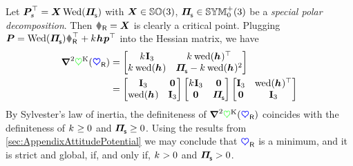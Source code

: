 Let $\mat{P}_{\!s}^\top = \mat{X} \wedMatOp(\bodyMOSs{}{})$ with $\boldsymbol{X}\in\mathbb{SO}(3)$, $\bodyMOSs{}{}\in\SymMatSP(3)$ be a \textit{special polar decomposition}.
Then $\RR = \mat{X}$ is clearly a critical point.
Plugging $\mat{P} = \wedMatOp(\bodyMOSs{}{}) \RR^\top + \bodyStiffness{}{}\bodyCOS{}{}\tuple{p}^\top$ into the Hessian matrix, we have
\begin{align}
 \differential^2 \potentialStiff(\sysCoordR) 
 &= \begin{bmatrix} \bodyStiffness{}{} \idMat[3] & \bodyStiffness{}{}\wedOp(\bodyCOS{}{})^\top \\ \bodyStiffness{}{}\wedOp(\bodyCOS{}{}) & \bodyMOSs{}{} - \bodyStiffness{}{} \wedOp(\bodyCOS{}{})^2 \end{bmatrix}
\nonumber\\
 &= \begin{bmatrix} \idMat[3] & \mat{0} \\ \wedOp(\bodyCOS{}{}) & \idMat[3] \end{bmatrix}
 \begin{bmatrix} 
  \bodyStiffness{}{} \idMat[3] & \mat{0} \\
  \mat{0} & \bodyMOSs{}{}
 \end{bmatrix}
 \begin{bmatrix} \idMat[3] & \wedOp(\bodyCOS{}{})^\top \\ \mat{0} & \idMat[3] \end{bmatrix}
\end{align}
By Sylvester's law of inertia, the definiteness of $\boldsymbol{\nabla}^2 \textcolor{green}{\heartsuit}^{\mathrm{K}}(\boldsymbol{\textcolor{blue}{\heartsuit}}_{\mathsf{R}})$ coincides with the definiteness of $\bodyStiffness{}{} \geq 0$ and $\bodyMOSs{}{} \geq 0$.
Using the results from \autoref{sec:AppendixAttitudePotential} we may conclude that $\boldsymbol{\textcolor{blue}{\heartsuit}}_{\mathsf{R}}$ is a minimum, and it is strict and global, if, and only if, $\bodyStiffness{}{} > 0$ and $\bodyMOSs{}{} > 0$.

